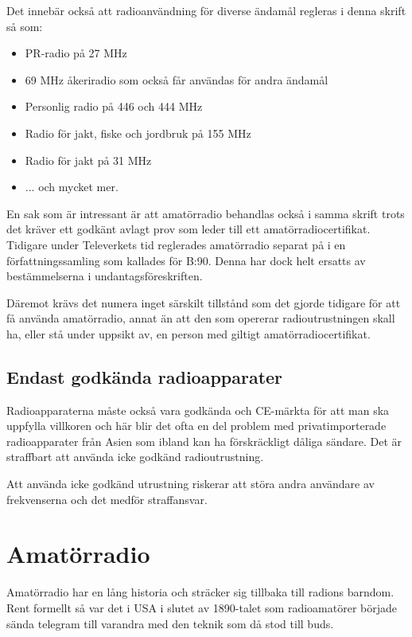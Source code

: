 Det innebär också att radioanvändning för diverse ändamål regleras i denna
skrift så som:

\begin{itemize}
 \item PR-radio på 27 MHz
 \item 69 MHz åkeriradio som också får användas för andra ändamål
 \item Personlig radio på 446 och 444 MHz
 \item Radio för jakt, fiske och jordbruk på 155 MHz
 \item Radio för jakt på 31 MHz
 \item ... och mycket mer.
\end{itemize}

En sak som är intressant är att amatörradio behandlas också i samma skrift
trots det kräver ett godkänt avlagt prov som leder till ett
amatörradiocertifikat. Tidigare under Televerkets tid reglerades amatörradio
separat på i en författningssamling som kallades för B:90. Denna har dock helt
ersatts av bestämmelserna i undantagsföreskriften.

Däremot krävs det numera inget särskilt tillstånd som det gjorde tidigare för
att få använda amatörradio, annat än att den som opererar radioutrustningen
skall ha, eller stå under uppsikt av, en person med giltigt
amatörradiocertifikat.

\subsection{Endast godkända radioapparater}

Radioapparaterna måste också vara godkända och CE-märkta för att man ska
uppfylla villkoren och här blir det ofta en del problem med privatimporterade
radioapparater från Asien som ibland kan ha förskräckligt dåliga sändare. Det
är straffbart att använda icke godkänd radioutrustning.

Att använda icke godkänd utrustning riskerar att störa andra användare av
frekvenserna och det medför straffansvar.

\section{Amatörradio}

Amatörradio har en lång historia och sträcker sig tillbaka till radions
barndom. Rent formellt så var det i USA i slutet av 1890-talet som
radioamatörer började sända telegram till varandra med den teknik som då stod
till buds.

